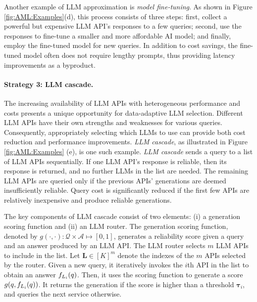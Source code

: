 \documentclass{article}
\begin{document}
Another example of LLM approximation is \textit{model fine-tuning}. As shown in Figure \ref{fig:AML:Examples}(d), this process consists of three steps: first, collect a powerful but expensive LLM API's responses to a few queries; second, use the responses to fine-tune a smaller and more affordable AI model; and finally, employ the fine-tuned model for new queries. In addition to cost savings, the fine-tuned model often does not require lengthy prompts, thus providing latency improvements as a byproduct.


\paragraph{Strategy 3: LLM cascade.}
The increasing availability of LLM APIs with heterogeneous performance and costs presents a unique opportunity for data-adaptive LLM selection. Different LLM APIs have their own strengths and weaknesses for various queries. Consequently, appropriately selecting which LLMs to use can provide both cost reduction and performance improvements. \textit{LLM cascade}, as illustrated in Figure \ref{fig:AML:Examples} (e), is one such example. \textit{LLM cascade} sends a query to a list of LLM APIs sequentially. If one LLM API's response is reliable, then its response is returned, and no further LLMs in the list are needed. The remaining LLM APIs are queried only if the previous APIs' generations are deemed insufficiently reliable. Query cost is significantly reduced if the first few APIs are relatively inexpensive and produce reliable generations.

The key components of LLM cascade consist of two elements: (i) a generation scoring function and (ii) an LLM router. The generation scoring function, denoted by $g(\cdot,\cdot):\mathcal{Q} \times \mathcal{A}\mapsto [0,1]$, generates a reliability score given a query and an answer produced by an LLM API. The LLM router selects $m$ LLM APIs to include in the list. Let $\pmb L \in [K]^m$ denote the indexes of the $m$ APIs selected by the router. Given a new query, it iteratively invokes the $i$th API in the list to obtain an answer $f_{L_i}(q)$. Then, it uses the scoring function to generate a score $ g(q,f_{L_i}(q))$. It returns the generation if the score is higher than a threshold $\pmb \tau_i$, and queries the next service otherwise.
\end{document}
